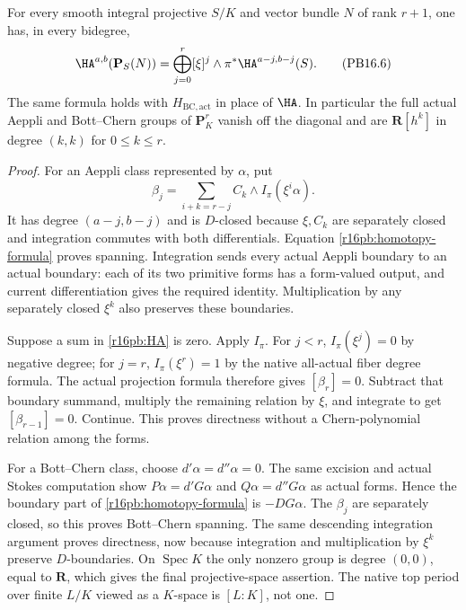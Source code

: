 \begin{theorem}
\label{r16pb:formula}
For every smooth integral projective $S/K$ and vector bundle $N$ of
rank $r+1$, one has, in every bidegree,
\[
 \HA^{a,b}(\mathbf P_S(N))
    =\bigoplus_{j=0}^{r}[\xi]^j\wedge
                       \pi^*\HA^{a-j,b-j}(S).
 \tag{PB16.6}\label{r16pb:HA}
\]
The same formula holds with $H_{\mathrm{BC,act}}$ in place of $\HA$.
In particular the full actual Aeppli and Bott--Chern groups of
$\mathbf P^r_K$ vanish off the diagonal and are $\mathbf R[h^k]$
in degree $(k,k)$ for $0\leq k\leq r$.
\end{theorem}

\begin{proof}
For an Aeppli class represented by $\alpha$, put
\[
 \beta_j=\sum_{i+k=r-j} C_k\wedge I_\pi(\xi^i\alpha).
\]
It has degree $(a-j,b-j)$ and is $D$-closed because $\xi,C_k$ are
separately closed and integration commutes with both differentials.
Equation \eqref{r16pb:homotopy-formula} proves spanning.
Integration sends every actual Aeppli boundary to an actual boundary:
each of its two primitive forms has a form-valued output, and current
differentiation gives the required identity. Multiplication by any
separately closed $\xi^k$ also preserves these boundaries.

Suppose a sum in \eqref{r16pb:HA} is zero. Apply $I_\pi$.
For $j<r$, $I_\pi(\xi^j)=0$ by negative degree; for $j=r$,
$I_\pi(\xi^r)=1$ by the native all-actual fiber degree formula.
The actual projection formula therefore gives $[\beta_r]=0$.
Subtract that boundary summand, multiply the remaining relation by
$\xi$, and integrate to get $[\beta_{r-1}]=0$. Continue. This proves
directness without a Chern-polynomial relation among the forms.

For a Bott--Chern class, choose $d'\alpha=d''\alpha=0$.
The same excision and actual Stokes computation show
$P\alpha=d'G\alpha$ and $Q\alpha=d''G\alpha$ as actual forms.
Hence the boundary part of \eqref{r16pb:homotopy-formula} is
$-DG\alpha$. The $\beta_j$ are separately closed, so this proves
Bott--Chern spanning. The same descending integration argument proves
directness, now because integration and multiplication by $\xi^k$
preserve $D$-boundaries. On $\operatorname{Spec}K$ the only nonzero
group is degree $(0,0)$, equal to $\mathbf R$, which gives the final
projective-space assertion. The native top period over finite $L/K$
viewed as a $K$-space is $[L:K]$, not one.
\end{proof}

